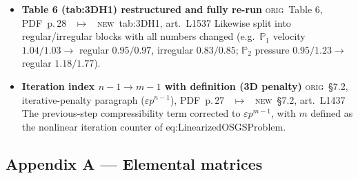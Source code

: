 \documentclass[11pt]{article}
\newcommand{\Orig}{\textcolor{origc}{\footnotesize\textsc{orig}}}
\newcommand{\New}{\textcolor{newc}{\footnotesize\textsc{new}}}
\newcommand{\code}[1]{\textcolor{newc}{\ttfamily\small #1}}
\newcommand{\pdfp}[1]{PDF~p.\,#1}
\newcommand{\artl}[1]{art.\ L#1}       %
\newcommand{\ch}[4]{%
  \item \textbf{#1}\newline
    {\footnotesize\Orig\ #2 \ \textcolor{locc}{$\longmapsto$} \ \New\ #3}\newline
    #4}
\begin{document}
\begin{itemize}
{    $1.70/1.63$; $\mathbb{P}_2$ $3.18/3.22\to$ regular $3.33/3.34$).}
\ch{Table 6 (\code{tab:3DH1}) restructured and fully re-run}
   {Table 6, \pdfp{28}}
   {\code{tab:3DH1}, \artl{1537}}
   {Likewise split into regular/irregular blocks with all numbers changed (e.g.\ $\mathbb{P}_1$
    velocity $1.04/1.03\to$ regular $0.95/0.97$, irregular $0.83/0.85$; $\mathbb{P}_2$ pressure
    $0.95/1.23\to$ regular $1.18/1.77$).}
\ch{Iteration index $n{-}1 \to m{-}1$ with definition (3D penalty)}
   {\S7.2, iterative-penalty paragraph ($\varepsilon p^{n-1}$), \pdfp{27}}
   {\S7.2, \artl{1437}}
   {The previous-step compressibility term corrected to $\varepsilon p^{m-1}$, with $m$ defined as the
    nonlinear iteration counter of \code{eq:LinearizedOSGSProblem}.}
\end{itemize}

\subsection{Appendix A --- Elemental matrices}
\end{document}
